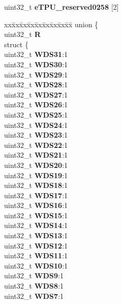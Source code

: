 \begin{DoxyCompactItemize}
\begin{tabbing}
\end{tabbing}\item 
\mbox{\label{structETPU__tag_acbda266fc5a3604a8ca25f45e9c6808d}} 
uint32\+\_\+t {\bfseries e\+T\+P\+U\+\_\+reserved0258} \mbox{[}2\mbox{]}
\item 
\mbox{\label{structETPU__tag_a0e9874c85fd1c56348af44b62ee28487}} 
\begin{tabbing}
xx\=xx\=xx\=xx\=xx\=xx\=xx\=xx\=xx\=\kill
union \{\\
\>uint32\_t {\bfseries R}\\
\>struct \{\\
\>\>uint32\_t {\bfseries WDS31}:1\\
\>\>uint32\_t {\bfseries WDS30}:1\\
\>\>uint32\_t {\bfseries WDS29}:1\\
\>\>uint32\_t {\bfseries WDS28}:1\\
\>\>uint32\_t {\bfseries WDS27}:1\\
\>\>uint32\_t {\bfseries WDS26}:1\\
\>\>uint32\_t {\bfseries WDS25}:1\\
\>\>uint32\_t {\bfseries WDS24}:1\\
\>\>uint32\_t {\bfseries WDS23}:1\\
\>\>uint32\_t {\bfseries WDS22}:1\\
\>\>uint32\_t {\bfseries WDS21}:1\\
\>\>uint32\_t {\bfseries WDS20}:1\\
\>\>uint32\_t {\bfseries WDS19}:1\\
\>\>uint32\_t {\bfseries WDS18}:1\\
\>\>uint32\_t {\bfseries WDS17}:1\\
\>\>uint32\_t {\bfseries WDS16}:1\\
\>\>uint32\_t {\bfseries WDS15}:1\\
\>\>uint32\_t {\bfseries WDS14}:1\\
\>\>uint32\_t {\bfseries WDS13}:1\\
\>\>uint32\_t {\bfseries WDS12}:1\\
\>\>uint32\_t {\bfseries WDS11}:1\\
\>\>uint32\_t {\bfseries WDS10}:1\\
\>\>uint32\_t {\bfseries WDS9}:1\\
\>\>uint32\_t {\bfseries WDS8}:1\\
\>\>uint32\_t {\bfseries WDS7}:1\\

\end{tabbing}
\end{DoxyCompactItemize}
